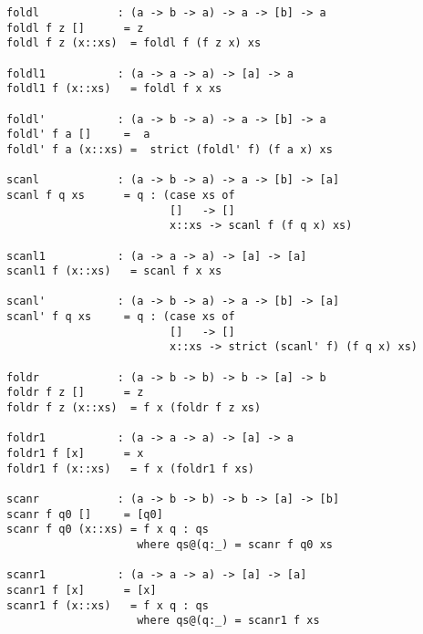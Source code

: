 \begin{verbatim}
foldl            : (a -> b -> a) -> a -> [b] -> a
foldl f z []      = z
foldl f z (x::xs)  = foldl f (f z x) xs

foldl1           : (a -> a -> a) -> [a] -> a
foldl1 f (x::xs)   = foldl f x xs

foldl'           : (a -> b -> a) -> a -> [b] -> a
foldl' f a []     =  a
foldl' f a (x::xs) =  strict (foldl' f) (f a x) xs

scanl            : (a -> b -> a) -> a -> [b] -> [a]
scanl f q xs      = q : (case xs of
                         []   -> []
                         x::xs -> scanl f (f q x) xs)

scanl1           : (a -> a -> a) -> [a] -> [a]
scanl1 f (x::xs)   = scanl f x xs

scanl'           : (a -> b -> a) -> a -> [b] -> [a]
scanl' f q xs     = q : (case xs of
                         []   -> []
                         x::xs -> strict (scanl' f) (f q x) xs)

foldr            : (a -> b -> b) -> b -> [a] -> b
foldr f z []      = z
foldr f z (x::xs)  = f x (foldr f z xs)

foldr1           : (a -> a -> a) -> [a] -> a
foldr1 f [x]      = x
foldr1 f (x::xs)   = f x (foldr1 f xs)

scanr            : (a -> b -> b) -> b -> [a] -> [b]
scanr f q0 []     = [q0]
scanr f q0 (x::xs) = f x q : qs
                    where qs@(q:_) = scanr f q0 xs

scanr1           : (a -> a -> a) -> [a] -> [a]
scanr1 f [x]      = [x]
scanr1 f (x::xs)   = f x q : qs
                    where qs@(q:_) = scanr1 f xs
\end{verbatim}
